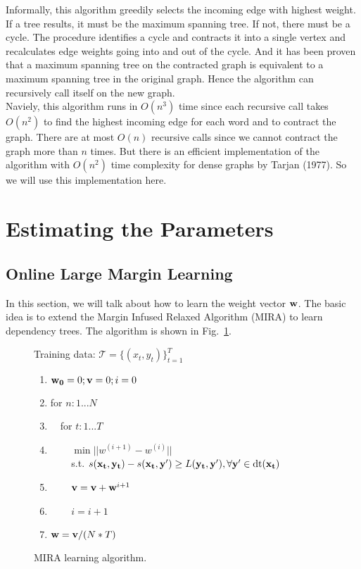 \documentclass[12pt]{article}
\begin{document}
Informally, this algorithm greedily selects the incoming edge with highest weight. If a tree results, it must be the maximum spanning tree. If not, there must be a cycle. The procedure identifies a cycle and contracts it into a single vertex and recalculates edge weights going into and out of the cycle. And it has been proven that a maximum spanning tree on the contracted graph is equivalent to a maximum spanning tree in the original graph. Hence the algorithm can recursively call itself on the new graph. \\

Naviely, this algorithm runs in $O(n^3)$ time since each recursive call takes $O(n^2)$ to find the highest incoming edge for each word and to contract the graph. There are at most $O(n)$ recursive calls since we cannot contract the graph more than $n$ times. But there is an efficient implementation of the algorithm with $O(n^2)$ time complexity for dense graphs by Tarjan (1977). So we will use this implementation here.

\section{Estimating the Parameters}

\subsection{Online Large Margin Learning}

In this section, we will talk about how to learn the weight vector ${\bf w}$. The basic idea is to extend the Margin Infused Relaxed Algorithm (MIRA) to learn dependency trees. The algorithm is shown in Fig.~\ref {fig:mira}. \\

\begin{figure} [!hpb]
  \begin{framed}
    Training data: $\mathcal {T} = \{ (x_t, y_t)\}^T_{t=1}$
    \begin{enumerate}
    \item ${\bf w_0} = 0; {\bf v} = 0; i = 0$
    \item for $n:1...N$
    \item $\text {  }$ for $t:1...T$
    \item $\text {  } \; \; \; \;$ $\min ||w^{(i+1)} - w^{(i)}||$ \\
          $\text {  } \; \; \; \;$ s.t. $s({\bf x_t, y_t}) - s({\bf x_t, y'}) \ge L({\bf y_t, y'}), \forall {\bf y'} \in \text {dt}({\bf x_t})$
    \item $\text {  } \; \; \; \;$ ${\bf v} = {\bf v} + {\bf w}^{i+1}$
    \item $\text {  } \; \; \; \;$ $i = i + 1$
    \item ${\bf w} = {\bf v} / (N * T)$
    \end{enumerate}
  \end{framed}
  \caption{MIRA learning algorithm. \label{fig:mira}}
\end{figure}
\end{document}
